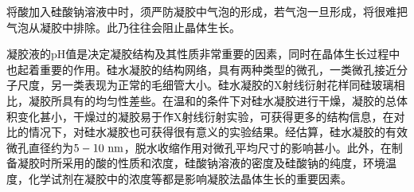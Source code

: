 将酸加入硅酸钠溶液中时，须严防凝胶中气泡的形成，若气泡一旦形成，将很难把气泡从凝胶中排除。此乃往往会阻止晶体生长。

凝胶液的pH值是决定凝胶结构及其性质非常重要的因素，同时在晶体生长过程中也起着重要的作用。硅水凝胶的结构网络，具有两种类型的微孔，一类微孔接近分子尺度，另一类表现为正常的毛细管大小。硅水凝胶的X射线衍射花样同硅玻璃相比，凝胶所具有的均匀性差些。在温和的条件下对硅水凝胶进行干燥，凝胶的总体积变化甚小，干燥过的凝胶易于作X射线衍射实验，可获得更多的结构信息，在对比的情况下，对硅水凝胶也可获得很有意义的实验结果。经估算，硅水凝胶的有效微孔直径约为$5-10\rm\ nm$，脱水收缩作用对微孔平均尺寸的影响甚小。此外，在制备凝胶时所采用的酸的性质和浓度，硅酸钠溶液的密度及硅酸钠的纯度，环境温度，化学试剂在凝胶中的浓度等都是影响凝胶法晶体生长的重要因素。

